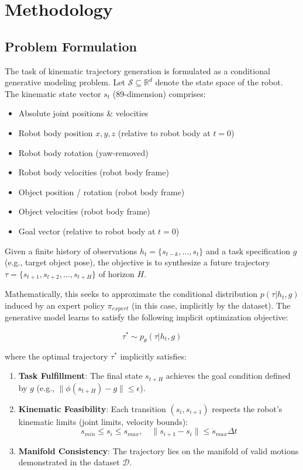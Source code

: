 \section{Methodology}

\subsection{Problem Formulation}\label{problem-formulation}

The task of kinematic trajectory generation is formulated as a
conditional generative modeling problem. Let
\(\mathcal{S} \subseteq \mathbb{R}^{d}\) denote the state space of the
robot. The kinematic state vector \(s_t\) (89-dimension) comprises:
\begin{itemize}
    \item Absolute joint positions \& velocities
    \item Robot body position $x, y, z$ (relative to robot body at $t=0$)
    \item Robot body rotation (yaw-removed)
    \item Robot body velocities (robot body frame)
    \item Object position / rotation (robot body frame)
    \item Object velocities (robot body frame)
    \item Goal vector (relative to robot body at $t=0$)
\end{itemize}

Given a finite history of observations \(h_t = \{s_{t-k}, \dots, s_t\}\)
and a task specification \(g\) (e.g., target object pose), the objective
is to synthesize a future trajectory
\(\tau = \{s_{t+1}, s_{t+2}, \dots, s_{t+H}\}\) of horizon \(H\).

Mathematically, this seeks to approximate the conditional distribution
\(p(\tau | h_t, g)\) induced by an expert policy \(\pi_{expert}\) (in this case, implicitly by the dataset). The generative model learns to satisfy the following implicit optimization
objective:

\[
\tau^* \sim p_\theta(\tau | h_t, g)
\]

where the optimal trajectory \(\tau^*\) implicitly satisfies: 
\begin{enumerate}
    \item \textbf{Task Fulfillment}: The final state \(s_{t+H}\) achieves the goal
    condition defined by \(g\) (e.g.,
    \(\| \phi(s_{t+H}) - g \| \le \epsilon\)). 
    \item \textbf{Kinematic
    Feasibility}: Each transition \((s_i, s_{i+1})\) respects the robot's
    kinematic limits (joint limits, velocity bounds):
    \[ s_{min} \le s_i \le s_{max}, \quad \| s_{i+1} - s_i \| \le \dot{s}_{max} \Delta t \]
    \item \textbf{Manifold Consistency}: The trajectory lies on the manifold of
    valid motions demonstrated in the dataset \(\mathcal{D}\).
\end{enumerate}


